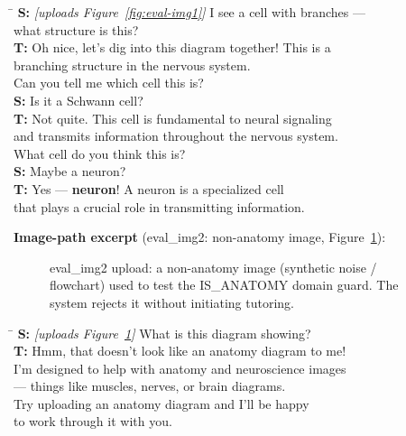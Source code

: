 \documentclass[11pt]{article}
\begin{document}
\begin{small}
\begin{tabbing}
\hspace{1.5em}\=\kill
\textbf{S:}\> \textit{[uploads Figure~\ref{fig:eval-img1}]}
              I see a cell with branches --- \\
            \> what structure is this? \\[3pt]
\textbf{T:}\> Oh nice, let's dig into this diagram together! This is a \\
            \> branching structure in the nervous system. \\
            \> Can you tell me which cell this is? \\[3pt]
\textbf{S:}\> Is it a Schwann cell? \\[3pt]
\textbf{T:}\> Not quite. This cell is fundamental to neural signaling \\
            \> and transmits information throughout the nervous system. \\
            \> What cell do you think this is? \\[3pt]
\textbf{S:}\> Maybe a neuron? \\[3pt]
\textbf{T:}\> Yes --- \textbf{neuron}! A neuron is a specialized cell \\
            \> that plays a crucial role in transmitting information.
\end{tabbing}
\end{small}

\noindent\textbf{Image-path excerpt} (eval\_img2: non-anatomy image,
Figure~\ref{fig:eval-img2}):

\begin{figure}[t]
  \centering
  \caption{eval\_img2 upload: a non-anatomy image (synthetic noise /
  flowchart) used to test the IS\_ANATOMY domain guard. The system
  rejects it without initiating tutoring.}
  \label{fig:eval-img2}
\end{figure}

\begin{small}
\begin{tabbing}
\hspace{1.5em}\=\kill
\textbf{S:}\> \textit{[uploads Figure~\ref{fig:eval-img2}]}
              What is this diagram showing? \\[3pt]
\textbf{T:}\> Hmm, that doesn't look like an anatomy diagram to me! \\
            \> I'm designed to help with anatomy and neuroscience images \\
            \> --- things like muscles, nerves, or brain diagrams. \\
            \> Try uploading an anatomy diagram and I'll be happy \\
            \> to work through it with you.
\end{tabbing}
\end{small}
\end{document}
